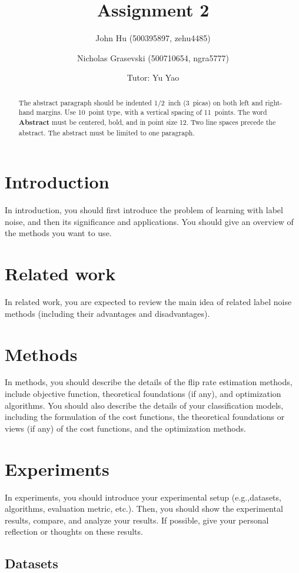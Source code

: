 \documentclass{article} %
\title{Assignment 2}
\author{
  John Hu (500395897, zehu4485)
  \and
  Nicholas Grasevski (500710654, ngra5777)
  \and
  Tutor: Yu Yao
}
\begin{document}
\maketitle

\begin{abstract}
The abstract paragraph should be indented 1/2~inch (3~picas) on both left and
right-hand margins. Use 10~point type, with a vertical spacing of 11~points.
The word \textbf{Abstract} must be centered, bold, and in point size 12. Two
line spaces precede the abstract. The abstract must be limited to one
paragraph.
\end{abstract}

\section{Introduction}
In introduction, you should first introduce the problem of learning with label noise, and then its significance and applications. You should give an overview of the methods you want to use.

\section{Related work}
In related work, you are expected to review the main idea of related label noise methods (including their advantages and disadvantages).

\section{Methods}
In methods, you should describe the details of the flip rate estimation methods, include objective function, theoretical foundations (if any), and optimization algorithms. You should also describe the details of your classification models, including the formulation of the cost functions, the theoretical foundations or views (if any) of the cost functions, and the optimization methods.

\section{Experiments}
In experiments, you should introduce your experimental setup (e.g.,datasets, algorithms, evaluation metric, etc.). Then, you should show the experimental results, compare, and analyze your results. If possible, give your personal reflection or thoughts on these results.

\subsection{Datasets}
\end{document}
